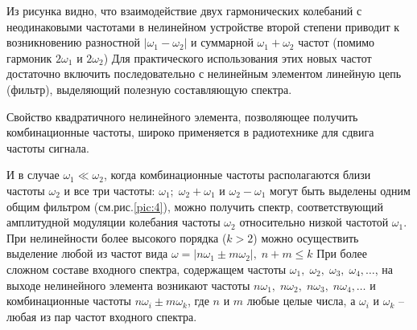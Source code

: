 Из рисунка видно, что взаимодействие двух гармонических колебаний с неодинаковыми частотами в нелинейном устройстве второй степени приводит к возникновению разностной $|\omega_1-\omega_2|$ и суммарной $\omega_1+\omega_2$ частот (помимо гармоник $2\omega_1$	и $2\omega_2$)
Для практического использования этих новых частот достаточно включить последовательно с нелинейным элементом линейную цепь (фильтр), выделяющий полезную составляющую спектра.

Свойство квадратичного нелинейного элемента, позволяющее получить комбинационные частоты, широко применяется в радиотехнике для сдвига частоты сигнала.

И в случае $\omega_1\ll\omega_2$, когда комбинационные частоты располагаются близи частоты $\omega_2$ и  все три частоты: $\omega_1;\;\omega_2+\omega_1$ и $\omega_2-\omega_1$ могут быть выделены одним общим фильтром (см.рис.\ref{pic:4}), можно получить спектр, соответствующий амплитудной модуляции колебания частоты $\omega_2$ относительно низкой частотой $\omega_1$. При нелинейности более высокого порядка ($k>2$) можно осуществить выделение любой из частот вида $\omega=|n\omega_1\pm m\omega_2|,\;n+m\leq k$
При более сложном составе входного спектра, содержащем частоты $\omega_1,\;\omega_2,\;\omega_3,\;\omega_4,\ldots$, на выходе нелинейного элемента возникают частоты $n\omega_1,\;n\omega_2,\;n\omega_3,\;n\omega_4,\ldots$ и комбинационные
частоты	$n\omega_i\pm m\omega_k$, где $n$ и $m$ любые целые числа, а $\omega_i$ и $\omega_k$ -- любая из пар частот входного спектра.
